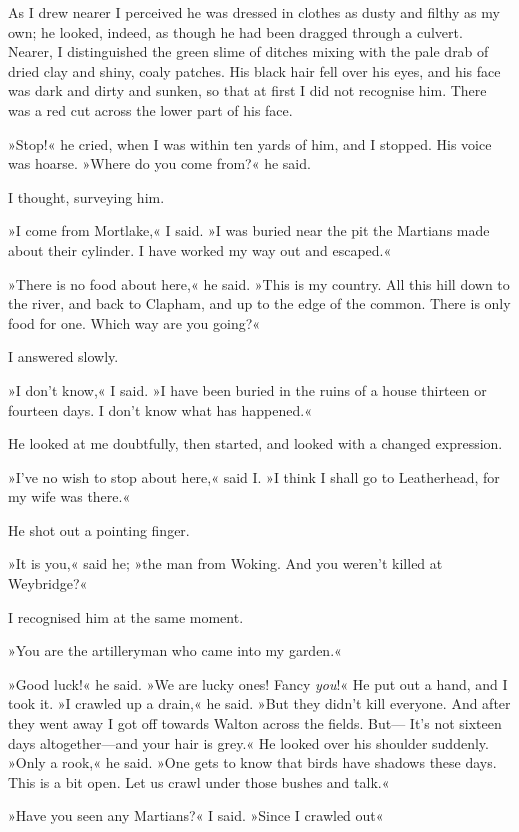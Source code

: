 As I drew nearer I perceived he was dressed in clothes as dusty and filthy as my own; he looked, indeed, as though he had been dragged through a culvert. Nearer, I distinguished the green slime of ditches mixing with the pale drab of dried clay and shiny, coaly patches. His black hair fell over his eyes, and his face was dark and dirty and sunken, so that at first I did not recognise him. There was a red cut across the lower part of his face.

»Stop!« he cried, when I was within ten yards of him, and I stopped. His voice was hoarse. »Where do you come from?« he said.

I thought, surveying him.

»I come from Mortlake,« I said. »I was buried near the pit the Martians made about their cylinder. I have worked my way out and escaped.«

»There is no food about here,« he said. »This is my country. All this hill down to the river, and back to Clapham, and up to the edge of the common. There is only food for one. Which way are you going?«

I answered slowly.

»I don't know,« I said. »I have been buried in the ruins of a house thirteen or fourteen days. I don't know what has happened.«

He looked at me doubtfully, then started, and looked with a changed expression.

»I've no wish to stop about here,« said I\@. »I think I shall go to Leatherhead, for my wife was there.«

He shot out a pointing finger.

»It is you,« said he; »the man from Woking. And you weren't killed at Weybridge?«

I recognised him at the same moment.

»You are the artilleryman who came into my garden.«

»Good luck!« he said. »We are lucky ones! Fancy \textit{you}!« He put out a hand, and I took it. »I crawled up a drain,« he said. »But they didn't kill everyone. And after they went away I got off towards Walton across the fields. But— It's not sixteen days altogether—and your hair is grey.« He looked over his shoulder suddenly. »Only a rook,« he said. »One gets to know that birds have shadows these days. This is a bit open. Let us crawl under those bushes and talk.«

»Have you seen any Martians?« I said. »Since I crawled out\longdash«

